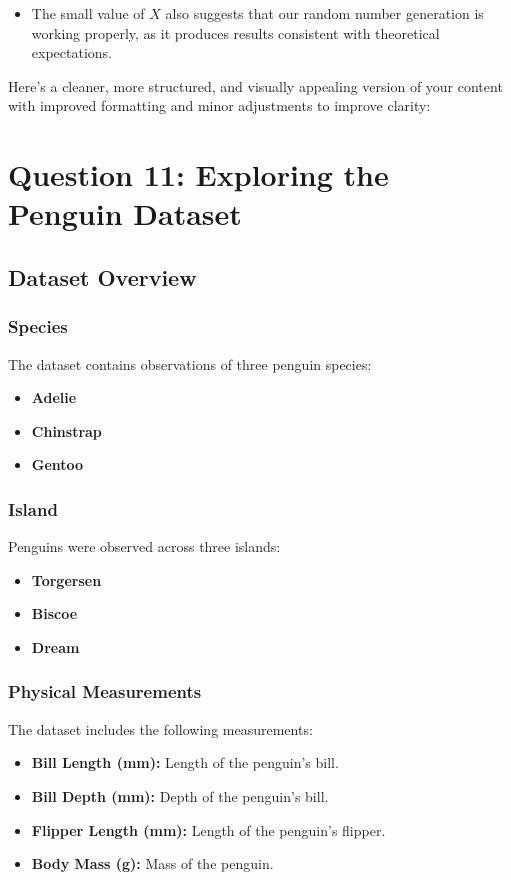 \documentclass[12pt]{article}
\begin{document}
\begin{itemize}
\begin{itemize}
    \item The small value of $X$ also suggests that our random number generation is working properly, as it produces results consistent with theoretical expectations.
\end{itemize}



Here's a cleaner, more structured, and visually appealing version of your content with improved formatting and minor adjustments to improve clarity:




\section*{Question 11: Exploring the Penguin Dataset}

\subsection*{Dataset Overview}

\subsubsection*{Species}
The dataset contains observations of three penguin species:  
\begin{itemize}
    \item \textbf{Adelie}
    \item \textbf{Chinstrap}
    \item \textbf{Gentoo}
\end{itemize}

\subsubsection*{Island}
Penguins were observed across three islands:  
\begin{itemize}
    \item \textbf{Torgersen}
    \item \textbf{Biscoe}
    \item \textbf{Dream}
\end{itemize}

\subsubsection*{Physical Measurements}
The dataset includes the following measurements:  
\begin{itemize}
    \item \textbf{Bill Length (mm):} Length of the penguin's bill.
    \item \textbf{Bill Depth (mm):} Depth of the penguin's bill.
    \item \textbf{Flipper Length (mm):} Length of the penguin's flipper.
    \item \textbf{Body Mass (g):} Mass of the penguin.
\end{itemize}


\end{itemize}
\end{document}
